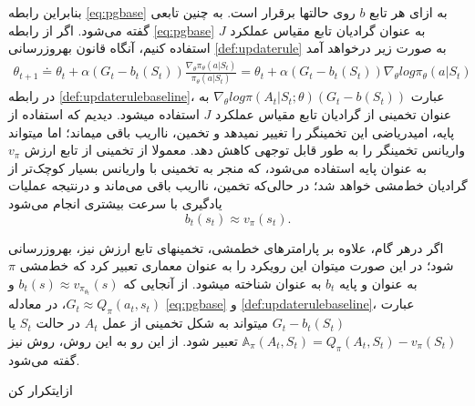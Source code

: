 بنابراین رابطه 
\ref{eq:pgbase}
به ازای هر تابع $b$ روی حالت\nf ها برقرار است. به چنین تابعی 
\textit{}
 گفته می‌شود. اگر از رابطه
  \ref{eq:pgbase}
  به عنوان گرادیان تابع مقیاس عملکرد $J$ استفاده کنیم، آنگاه قانون به\nf روزرسانی 
  \ref{def:updaterule}
  به صورت زیر درخواهد آمد
\begin{align}
\theta_{t+1} \doteq \theta_t + \alpha (G_t - b_t(S_t)) \frac{\nabla_\theta \pi_\theta (a|S_t)}{\pi_\theta (a|S_t)} = \theta_t + \alpha (G_t- b_t(S_t)) \nabla_\theta log \pi_\theta (a|S_t)
\label{def:updaterulebaseline}
\end{align}
در رابطه 
\ref{def:updaterulebaseline}،
عبارت 
$\nabla_\theta  log  \pi(A_t|S_t;\theta) (G_t - b(S_t))$
به عنوان تخمینی از گرادیان تابع مقیاس عملکرد $J$ استفاده می\nf شود. دیدیم که استفاده از پایه، امیدریاضی این تخمین\nf گر را  تغییر نمی\nf دهد و تخمین، نااریب باقی می\nf ماند؛ اما می\nf تواند واریانس تخمین\nf گر را به طور قابل توجهی کاهش دهد. معمولا از تخمینی از تابع ارزش $v_\pi$ به عنوان پایه استفاده می‌شود،
که منجر به تخمینی با واریانس بسیار کوچک‌تر از گرادیان خط‌مشی خواهد شد؛ در حالی‌که تخمین، نااریب باقی می‌ماند و درنتیجه عملیات یادگیری با سرعت بیشتری انجام می‌شود
$$b_t(s_t) \approx v_\pi (s_t).$$

اگر درهر گام، علاوه بر پارامترهای خط\nf مشی، تخمین\nf های تابع ارزش نیز، به\nf روزرسانی شود؛  در این صورت می\nf توان این رویکرد را به عنوان معماری 
\textit{}
 تعبیر کرد که خط‌مشی $\pi$  به عنوان  و پایه $b_t$ به عنوان   شناخته می\nf شود.
از آنجایی که
$b_t(s) \approx v_{\pi_{\theta_t}}(s)$
و
$G_t \approx Q_\pi (a_t, s_t)$،
در معادله 
\ref{eq:pgbase} و
\ref{def:updaterulebaseline}،
عبارت
$G_t - b_t(S_t)$
می\nf تواند به شکل تخمینی از
\textit{}
 عمل $A_t$ در حالت $S_t$ یا 
$\mathbb{A}_\pi(A_t,S_t)=Q_\pi(A_t,S_t)-v_\pi(S_t)$
 تعبیر شود. از این رو به این روش، روش 
\textit{
}
نیز گفته می‌شود.

‌ازای{تکرار کن}

